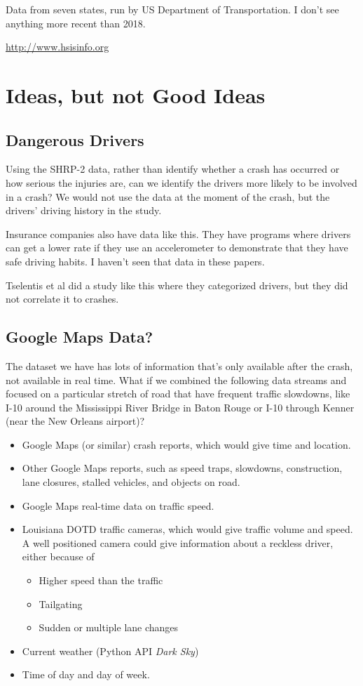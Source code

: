 \documentclass[11pt]{article}
\begin{document}
\begin{spacing}{1.2}
Data from seven states, run by US Department of Transportation.  I don't see anything more recent than 2018.

\url{http://www.hsisinfo.org}

\section{Ideas, but not Good Ideas}
\subsection{Dangerous Drivers}

Using the SHRP-2 data, rather than identify whether a crash has occurred or how serious the injuries are, can we identify the drivers more likely to be involved in a crash?  We would not use the data at the moment of the crash, but the drivers' driving history in the study.

Insurance companies also have data like this.  They have programs where drivers can get a lower rate if they use an accelerometer to demonstrate that they have safe driving habits.  I haven't seen that data in these papers.  

Tselentis et al did a study like this \cite{TSELENTIS2021106081} where they categorized drivers, but they did not correlate it to crashes.  


\subsection{Google Maps Data?}

The dataset we have has lots of information that's only available after the crash, not available in real time.  What if we combined the following data streams and focused on a particular stretch of road that have frequent traffic slowdowns, like I-10 around the Mississippi River Bridge in Baton Rouge or I-10 through Kenner (near the New Orleans airport)?

\begin{itemize}
	\item Google Maps (or similar) crash reports, which would give time and location.
	\item Other Google Maps reports, such as speed traps, slowdowns, construction, lane closures, stalled vehicles, and objects on road.
	\item Google Maps real-time data on traffic speed.
	\item Louisiana DOTD traffic cameras, which would give traffic volume and speed.  A well positioned camera could give information about a reckless driver, either because of 
	\begin {itemize}
		\item Higher speed than the traffic
		\item Tailgating
		\item Sudden or multiple lane changes
	\end{itemize}
	\item Current weather (Python API {\it Dark Sky})
	\item Time of day and day of week.
\end{itemize}


\end{spacing}
\end{document}
